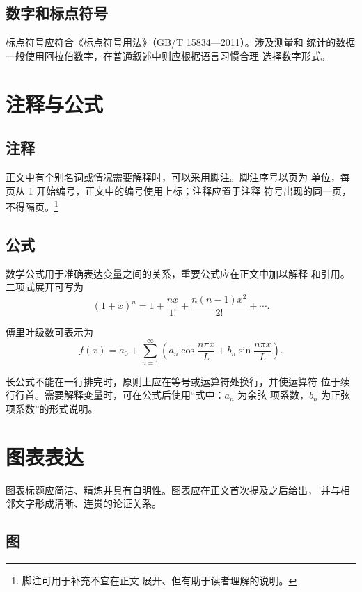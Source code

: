 \subsection{数字和标点符号}

标点符号应符合《标点符号用法》（GB/T 15834—2011）。涉及测量和
统计的数据一般使用阿拉伯数字，在普通叙述中则应根据语言习惯合理
选择数字形式。

\section{注释与公式}

\subsection{注释}

正文中有个别名词或情况需要解释时，可以采用脚注。脚注序号以页为
单位，每页从 1 开始编号，正文中的编号使用上标；注释应置于注释
符号出现的同一页，不得隔页。\footnote{脚注可用于补充不宜在正文
展开、但有助于读者理解的说明。}

\subsection{公式}

数学公式用于准确表达变量之间的关系，重要公式应在正文中加以解释
和引用。二项式展开可写为
\begin{equation}
  (1+x)^n
  = 1 + \frac{nx}{1!}
  + \frac{n(n-1)x^2}{2!} + \cdots .
  \label{eq:binomial}
\end{equation}

傅里叶级数可表示为
\begin{equation}
  f(x)=a_0+\sum_{n=1}^{\infty}
  \left(a_n\cos\frac{n\pi x}{L}
  +b_n\sin\frac{n\pi x}{L}\right).
  \label{eq:fourier}
\end{equation}

长公式不能在一行排完时，原则上应在等号或运算符处换行，并使运算符
位于续行行首。需要解释变量时，可在公式后使用“式中：$a_n$ 为余弦
项系数，$b_n$ 为正弦项系数”的形式说明。

\section{图表表达}

图表标题应简洁、精炼并具有自明性。图表应在正文首次提及之后给出，
并与相邻文字形成清晰、连贯的论证关系。

\subsection{图}

